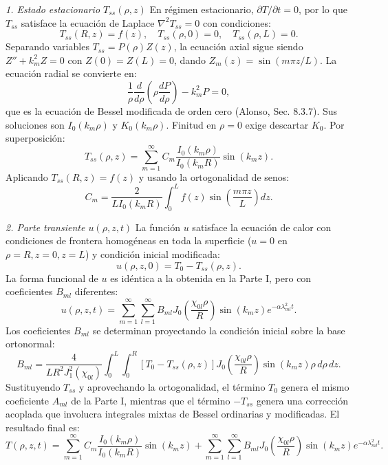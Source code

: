 \documentclass[a4paper]{article}
\begin{document}
\textit{1. Estado estacionario $T_{ss}(\rho, z)$}
En régimen estacionario, $\partial T/\partial t = 0$, por lo que $T_{ss}$ satisface la ecuación de Laplace $\nabla^2 T_{ss} = 0$ con condiciones:
$$T_{ss}(R, z) = f(z), \quad T_{ss}(\rho, 0) = 0, \quad T_{ss}(\rho, L) = 0.$$
Separando variables $T_{ss} = P(\rho)Z(z)$, la ecuación axial sigue siendo $Z'' + k_m^2 Z = 0$ con $Z(0)=Z(L)=0$, dando $Z_m(z) = \sin(m\pi z/L)$. La ecuación radial se convierte en:
$$\frac{1}{\rho} \frac{d}{d\rho} \left( \rho \frac{dP}{d\rho} \right) - k_m^2 P = 0,$$
que es la ecuación de Bessel modificada de orden cero (Alonso, Sec. 8.3.7). Sus soluciones son $I_0(k_m \rho)$ y $K_0(k_m \rho)$. Finitud en $\rho=0$ exige descartar $K_0$. Por superposición:
$$T_{ss}(\rho, z) = \sum_{m=1}^{\infty} C_m \frac{I_0(k_m \rho)}{I_0(k_m R)} \sin(k_m z).$$
Aplicando $T_{ss}(R, z) = f(z)$ y usando la ortogonalidad de senos:
$$C_m = \frac{2}{L I_0(k_m R)} \int_0^L f(z) \sin\left( \frac{m\pi z}{L} \right) dz.$$

\textit{2. Parte transiente $u(\rho, z, t)$}
La función $u$ satisface la ecuación de calor con condiciones de frontera homogéneas en toda la superficie ($u=0$ en $\rho=R, z=0, z=L$) y condición inicial modificada:
$$u(\rho, z, 0) = T_0 - T_{ss}(\rho, z).$$
La forma funcional de $u$ es idéntica a la obtenida en la Parte I, pero con coeficientes $B_{ml}$ diferentes:
$$u(\rho, z, t) = \sum_{m=1}^{\infty} \sum_{l=1}^{\infty} B_{ml} J_0\left( \frac{\chi_{0l} \rho}{R} \right) \sin(k_m z) e^{-\alpha \lambda_{ml}^2 t}.$$
Los coeficientes $B_{ml}$ se determinan proyectando la condición inicial sobre la base ortonormal:
$$B_{ml} = \frac{4}{L R^2 J_1^2(\chi_{0l})} \int_0^L \int_0^R \left[ T_0 - T_{ss}(\rho, z) \right] J_0\left( \frac{\chi_{0l} \rho}{R} \right) \sin(k_m z) \rho \, d\rho \, dz.$$
Sustituyendo $T_{ss}$ y aprovechando la ortogonalidad, el término $T_0$ genera el mismo coeficiente $A_{ml}$ de la Parte I, mientras que el término $-T_{ss}$ genera una corrección acoplada que involucra integrales mixtas de Bessel ordinarias y modificadas. El resultado final es:
$$T(\rho, z, t) = \sum_{m=1}^{\infty} C_m \frac{I_0(k_m \rho)}{I_0(k_m R)} \sin(k_m z) + \sum_{m=1}^{\infty} \sum_{l=1}^{\infty} B_{ml} J_0\left( \frac{\chi_{0l} \rho}{R} \right) \sin(k_m z) e^{-\alpha \lambda_{ml}^2 t}.$$
\end{document}
